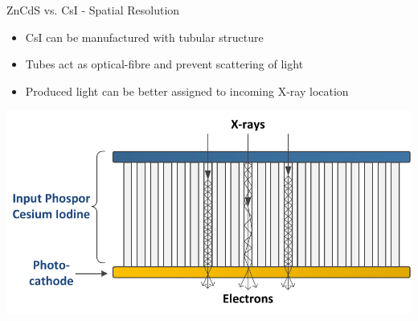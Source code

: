 \begin{frame}{ZnCdS vs. CsI - Spatial Resolution}
    \begin{itemize}
        \item  CsI can be manufactured with tubular structure
        \item  Tubes act as optical-fibre and prevent scattering of light
        \item  Produced light can be better assigned to incoming X-ray location
    \end{itemize}
    \begin{center}
        \hspace{-2cm}\includegraphics[width=0.75\columnwidth]{images/CsI_structure}%
    \end{center}
\end{frame}

